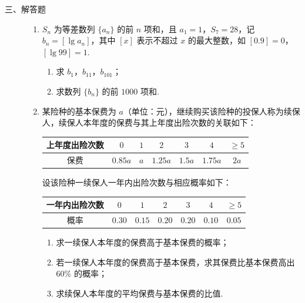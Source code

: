 \begin{description}

    \item[三、解答题]

    \begin{enumerate}[leftmargin=5pt]

      \addtocounter{enumi}{+16}

        \item \(S_n\) 为等差数列 \(\{a_n\}\) 的前 \(n\) 项和，且 \(a_1=1\)，\(S_7=28\)，记 \(b_n=[\lg a_n]\)，其中 \([x]\) 表示不超过 \(x\) 的最大整数，如 \([0.9]=0\)，\([\lg99]=1\).

\begin{enumerate}
\item 求 \(b_1\)，\(b_{11}\)，\(b_{101}\)；
\item 求数列 \(\{b_n\}\) 的前 \(1000\) 项和.
\end{enumerate}

        \item 某险种的基本保费为 \(a\)（单位：元），继续购买该险种的投保人称为续保人，续保人本年度的保费与其上年度出险次数的关联如下：

\begin{center}
\begin{tabular}{c|cccccc}
上年度出险次数 & \(0\) & \(1\) & \(2\) & \(3\) & \(4\) & \(\geq 5\)\\
\hline
保费 & \(0.85a\) & \(a\) & \(1.25a\) & \(1.5a\) & \(1.75a\) & \(2a\)
\end{tabular}
\end{center}

设该险种一续保人一年内出险次数与相应概率如下：

\begin{center}
\begin{tabular}{c|cccccc}
一年内出险次数 & \(0\) & \(1\) & \(2\) & \(3\) & \(4\) & \(\geq 5\)\\
\hline
概率 & \(0.30\) & \(0.15\) & \(0.20\) & \(0.20\) & \(0.10\) & \(0.05\)
\end{tabular}
\end{center}

\begin{enumerate}
\item 求一续保人本年度的保费高于基本保费的概率；
\item 若一续保人本年度的保费高于基本保费，求其保费比基本保费高出 \(60\%\) 的概率；
\item 求续保人本年度的平均保费与基本保费的比值.
\end{enumerate}


\end{enumerate}
\end{description}
